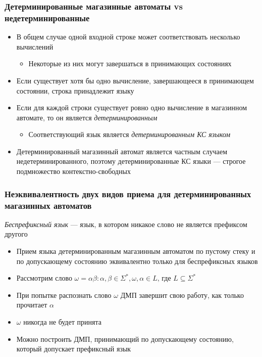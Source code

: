 \documentclass[dvipsnames]{beamer}
\begin{document}
\begin{frame}[fragile]
  \transwipe[direction=90]
  \frametitle{Детерминированные магазинные автоматы vs недетерминированные}
\begin{itemize}
	\item В общем случае одной входной строке может соответствовать несколько вычислений
	\begin{itemize}
		\item Некоторые из них могут завершаться в принимающих состояниях
	\end{itemize}
	\item Если существует хотя бы одно вычисление, завершающееся в принимающем состоянии, строка принадлежит языку
	\item Если для каждой строки существует ровно одно вычисление в магазинном автомате, то он является \emph{детерминированным}
	\begin{itemize}
		\item Соответствующий язык является \emph{детерминированным КС языком}
	\end{itemize}
	\item Детерминированный магазинный автомат является частным случаем недетерминированного, поэтому детерминированные КС языки --- строгое подмножество контекстно-свободных 
\end{itemize}
\end{frame}

\begin{frame}[fragile]
  \transwipe[direction=90]
  \frametitle{Неэквивалентность двух видов приема для детерминированных магазинных автоматов}

  \emph{Беспрефиксный язык} --- язык, в котором никакое слово не является префиксом другого

  \begin{itemize}
    \item Прием языка детерминированным магазинным автоматом по пустому стеку и по допускающему состоянию эквивалентно только для беспрефиксных языков
    \item Рассмотрим слово $\omega = \alpha \beta: \alpha, \beta \in \Sigma^*, \omega, \alpha \in L \text{, где } L \subseteq \Sigma^*$
    \item При попытке распознать слово $\omega$ ДМП завершит свою работу, как только прочитает $\alpha$
    \item $\omega$ никогда не будет принята
    \item Можно построить ДМП, принимающий по допускающему состоянию, который допускает префиксный язык
  \end{itemize}
\end{frame}
\end{document}
